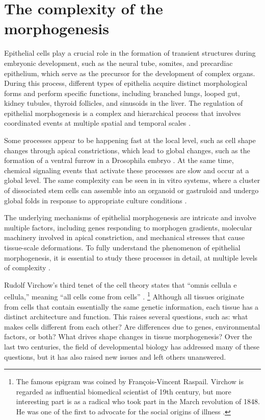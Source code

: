 

\hypertarget{the-complexity-of-the-morphogenesis}{%
\section{The complexity of the
morphogenesis}\label{the-complexity-of-the-morphogenesis}}

Epithelial cells play a crucial role in the formation of transient structures during embryonic development, such as the neural tube, somites, and precardiac epithelium, which serve as the precursor for the development of complex organs. During this process, different types of epithelia acquire distinct morphological forms and perform specific functions, including branched lungs, looped gut, kidney tubules, thyroid follicles, and sinusoids in the liver. The regulation of epithelial morphogenesis is a complex and hierarchical process that involves coordinated events at multiple spatial and temporal scales \cite{trepat2018}.

Some processes appear to be happening fast at the local level, such as cell shape changes through apical constrictions, which lead to global changes, such as the formation of a ventral furrow in a Drosophila embryo \cite{martin2009}. At the same time, chemical signaling events that activate these processes are slow and occur at a global level. The same complexity can be seen in in vitro systems, where a cluster of dissociated stem cells can assemble into an organoid or gastruloid and undergo global folds in response to appropriate culture conditions \cite{collinet2021}.

The underlying mechanisms of epithelial morphogenesis are intricate and involve multiple factors, including genes responding to morphogen gradients, molecular machinery involved in apical constriction, and mechanical stresses that cause tissue-scale deformations. To fully understand the phenomenon of epithelial morphogenesis, it is essential to study these processes in detail, at multiple levels of complexity \cite{schock2002, lecuit2011}.

Rudolf Virchow's third tenet of the cell theory states that ``omnis cellula e cellula,'' meaning ``all cells come from cells'' \cite{virchow1860}.
\footnote{The famous epigram was coined by François-Vincent Raspail. Virchow is regarded as influential biomedical scientist of 19th century, but more interesting part is as a radical who took part in the March revolution of 1848. He was one of the first to advocate for the social origins of illness \cite{wright2012, brown2006}.}
Although all tissues originate from cells that contain essentially the same genetic information, each tissue has a distinct architecture and function. This raises several questions, such as: what makes cells different from each other? Are differences due to genes, environmental factors, or both? What drives shape changes in tissue morphogenesis? Over the last two centuries, the field of developmental biology has addressed many of these questions, but it has also raised new issues and left others unanswered.

